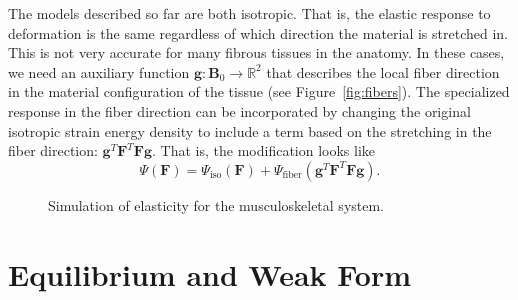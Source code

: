 The models described so far are both isotropic. That is, the elastic response to deformation is the same regardless of which direction the material is stretched in. This is not very accurate for many fibrous tissues in the anatomy. In these cases, we need an auxiliary function $\mathbf{g} \colon \mathbf{B}_0 \to \mathbb{R}^2$ that describes the local fiber direction in the material configuration of the tissue (see Figure~\ref{fig:fibers}). The specialized response in the fiber direction can be incorporated by changing the original isotropic strain energy density to include a term based on the stretching in the fiber direction: $\mathbf{g}^T \mathbf{F}^T \mathbf{F} \mathbf{g}$. That is, the modification looks like
\begin{equation*}
\Psi \left( \mathbf{F} \right) = \Psi_{\text{iso}} \left( \mathbf{F} \right) + \Psi_{\text{fiber}} \left( \mathbf{g}^T \mathbf{F}^T \mathbf{F} \mathbf{g} \right).
\end{equation*}

\begin{figure}
\caption{Simulation of elasticity for the musculoskeletal system.}
\end{figure}

\section*{Equilibrium and Weak Form}

